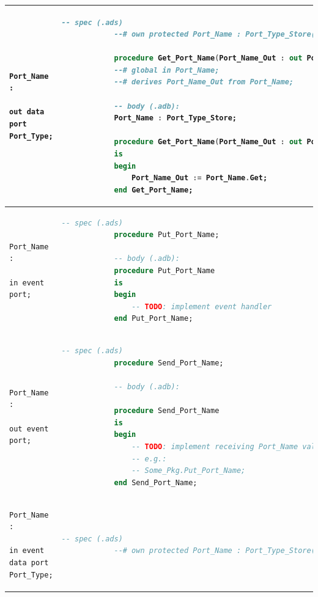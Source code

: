 \begin{center}
\begin{longtable}{| p{2in} | p{4in} |}
		\\ \hline

		\begin{lstlisting}[language=aadl]
			Port_Name : 
				out data port Port_Type;
		\end{lstlisting} 
		&
		\begin{lstlisting}[language=ada]
			-- spec (.ads)
			--# own protected Port_Name : Port_Type_Store(Priority => 10)
			
			procedure Get_Port_Name(Port_Name_Out : out Port_Type);
			--# global in Port_Name;
			--# derives Port_Name_Out from Port_Name;

			-- body (.adb):
			Port_Name : Port_Type_Store;

			procedure Get_Port_Name(Port_Name_Out : out Port_Type)
			is
			begin
				Port_Name_Out := Port_Name.Get;
			end Get_Port_Name;
		\end{lstlisting} 

		\\ \hline

		\begin{lstlisting}[language=aadl]
			Port_Name : 
				in event port;
		\end{lstlisting} 
		&
		\begin{lstlisting}[language=ada]
			-- spec (.ads)
			procedure Put_Port_Name;

			-- body (.adb):
			procedure Put_Port_Name 
			is
			begin
				-- TODO: implement event handler
			end Put_Port_Name;
		\end{lstlisting} 

		\\ \hline

		\begin{lstlisting}[language=aadl]
			Port_Name : 
				out event port;
		\end{lstlisting} 
		&
		\begin{lstlisting}[language=ada]
			-- spec (.ads)
			procedure Send_Port_Name;

			-- body (.adb):

			procedure Send_Port_Name 
			is
			begin
				-- TODO: implement receiving Port_Name value
				-- e.g.:
				-- Some_Pkg.Put_Port_Name;
			end Send_Port_Name;
		\end{lstlisting} 

		\\ \hline

		\begin{lstlisting}[language=aadl]
			Port_Name : 
				in event data port Port_Type;
		\end{lstlisting} 
		&
		\begin{lstlisting}[language=ada]
			-- spec (.ads)
			--# own protected Port_Name : Port_Type_Store(Priority => 10);


\end{lstlisting}
\end{longtable}
\end{center}
